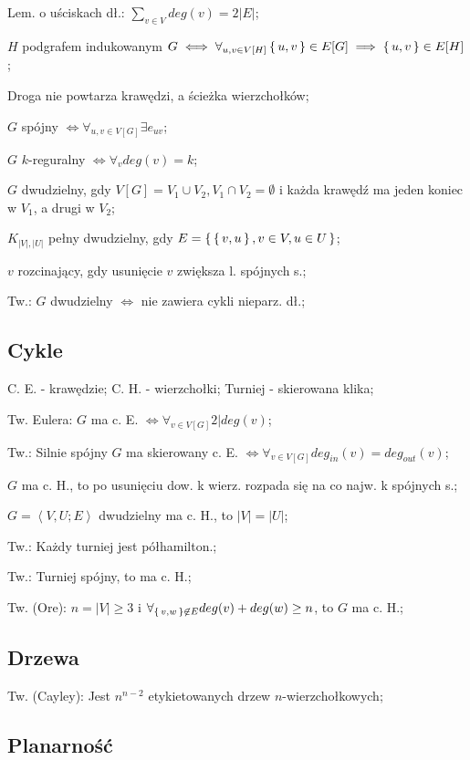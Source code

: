 \documentclass[10pt,a4paper,twocolumn]{article}
\newcommand{\angles}[1]{\left\langle #1 \right\rangle}
\begin{document}
Lem. o uściskach dł.: $\sum_{v\in V} deg(v) = 2|E|$;

$H$ podgrafem indukowanym $G
  \iff \forall_{u,v \in V[H]} \set{u, v} \in E[G] \implies \set{u, v}\in E[H]$;

Droga nie powtarza krawędzi, a ścieżka wierzchołków;

$G$ spójny $\iff \forall_{u,v\in V[G]} \exists e_{uv}$;

$G$ $k$-reguralny $\iff \forall_v deg(v) = k$;

$G$ dwudzielny, gdy $V[G] = V_1 \cup V_2, V_1 \cap V_2 = \emptyset$ i każda
  krawędź ma jeden koniec w $V_1$, a drugi w $V_2$;

$K_{|V|, |U|}$ pełny dwudzielny, gdy $E=\set{\set{v, u}, v \in V, u \in U}$;

$v$ rozcinający, gdy usunięcie $v$ zwiększa l. spójnych s.;

Tw.: $G$ dwudzielny $\iff$ nie zawiera cykli nieparz. dł.;

\subsection{Cykle}

C. E. - krawędzie; C. H. - wierzchołki; Turniej - skierowana klika;

Tw. Eulera: $G$ ma c. E. $\iff \forall_{v \in V[G]} 2|deg(v)$;

Tw.: Silnie spójny $G$ ma skierowany c. E.
  $\iff \forall_{v \in V[G]} deg_{in}(v) = deg_{out}(v)$;

$G$ ma c. H., to po usunięciu dow. k wierz. rozpada się na co najw.
  k spójnych s.;

$G = \angles{V, U; E}$ dwudzielny ma c. H., to $|V|=|U|$;

Tw.: Każdy turniej jest półhamilton.;

Tw.: Turniej spójny, to ma c. H.;

Tw. (Ore): $n=|V|\geq 3$ i
  $\forall_{\set{v, w} \not\in E} deg(v) + deg(w) \geq n$, to $G$ ma c. H.;

\subsection{Drzewa}

Tw. (Cayley): Jest $n^{n-2}$ etykietowanych drzew $n$-wierzchołkowych;

\subsection{Planarność}
\end{document}
